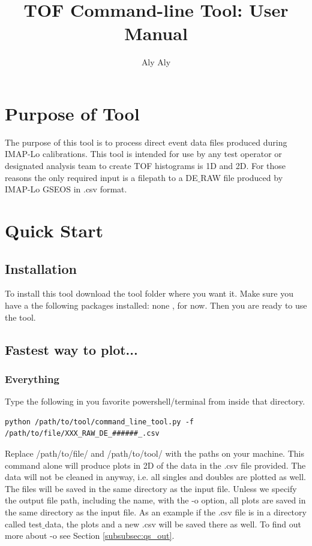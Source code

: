 \documentclass[12pt]{article}
\title{TOF Command-line Tool: User Manual}
\author{Aly Aly}
\begin{document}
\maketitle
\section{Purpose of Tool}
The purpose of this tool is to process direct event data files produced during IMAP-Lo calibrations. This tool is intended for use by any test operator or designated analysis team to create TOF histograms is 1D and 2D. For those reasons the only required input is a filepath to a DE$\_$RAW file produced by IMAP-Lo GSEOS in .csv format.

\section{Quick Start}

\subsection{Installation}
\label{subsec:qckstrt}
To install this tool download the tool folder where you want it. Make sure you have a the following packages installed:
none
, for now. Then you are ready to use the tool.

\subsection{Fastest way to plot...}

\subsubsection{Everything} 
\label{subsubsec:everything}
Type the following in you favorite powershell/terminal from inside that directory. 

\begin{verbatim}
python /path/to/tool/command_line_tool.py -f /path/to/file/XXX_RAW_DE_######_.csv

\end{verbatim}
Replace /path/to/file/ and /path/to/tool/ with the paths on your machine. This command alone will produce plots in 2D of the data in the .csv file provided. The data will not be cleaned in anyway, i.e. all singles and doubles are plotted as well. The files will be saved in the same directory as the input file. Unless we specify the output file path, including the name, with the -o option, all plots are saved in the same directory as the input file. As an example if the .csv file is in a directory called test$\_$data, the plots and a new .csv will be saved there as well. To find out more about -o see Section \ref{subsubsec:qs_out}.
\end{document}
